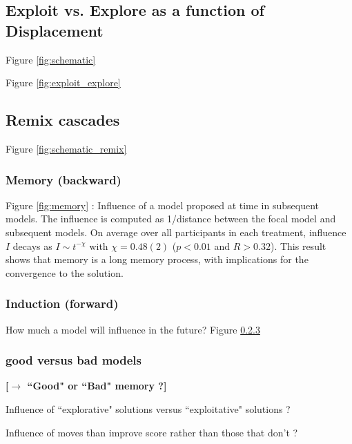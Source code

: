 \subsection{Exploit vs. Explore as a function of Displacement}

Figure \ref{fig:schematic}

Figure \ref{fig:exploit_explore}


\subsection{Remix cascades}

Figure \ref{fig:schematic_remix}

\subsubsection{Memory (backward)}
Figure \ref{fig:memory} : Influence of a model proposed at time in subsequent models. The influence is computed as 1/distance between the focal model and subsequent models. On average over all participants in each treatment, influence $I$ decays as $I \sim t^{-\chi}$ with $\chi = 0.48(2)$ ($p < 0.01$ and $R > 0.32$). This result shows that memory is a long memory process, with implications for the convergence to the solution.

\subsubsection{Induction (forward)}

How much a model will influence in the future? 
Figure \ref{}


\subsubsection{good versus bad models}
{\bf [$\rightarrow$  ``Good" or ``Bad" memory ?]}

Influence of ``explorative" solutions versus ``exploitative" solutions ?

Influence of moves than improve score rather than those that don't ?

